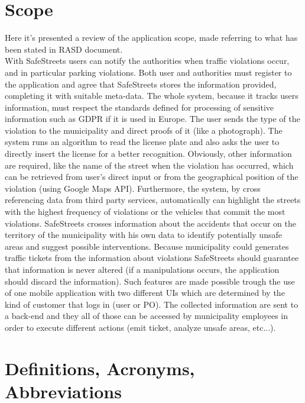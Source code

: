     \section{Scope}
    Here it's presented a review of the application scope, made referring to
    what has been stated in RASD document.\\ With SafeStreets users can notify
    the authorities when traffic violations occur, and in particular parking
    violations. Both user and authorities must register to the application and
    agree that SafeStreets stores the information provided, completing it with
    suitable meta-data. The whole system, because it tracks users information,
    must respect the standards defined for processing of sensitive information
    such as GDPR if it is used in Europe. The user sends the type of the
    violation to the municipality and direct proofs of it (like a photograph).
    The system runs an algorithm to read the license plate and also asks the
    user to directly insert the license for a better recognition. Obviously,
    other information are required, like the name of the street when the
    violation has occurred, which can be retrieved from user's direct input or
    from the geographical position of the violation (using Google Maps API).
    Furthermore, the system, by cross referencing data from third party
    services, automatically can highlight the streets with the highest frequency
    of violations or the vehicles that commit the most violations. SafeStreets
    crosses information about the accidents that occur on the territory of the
    municipality with his own data to identify potentially unsafe areas and
    suggest possible interventions. Because municipality could generates traffic
    tickets from the information about violations SafeStreets should guarantee
    that information is never altered (if a manipulations occurs, the
    application should discard the information). Such features are made possible
    trough the use of one mobile application with two different UIs which are
    determined by the kind of customer that logs in (user or PO). The collected
    information are sent to a back-end and they all of those can be accessed by
    municipality employees in order to execute different actions (emit ticket,
    analyze unsafe areas, etc...).
    
    \section{Definitions, Acronyms, Abbreviations}
